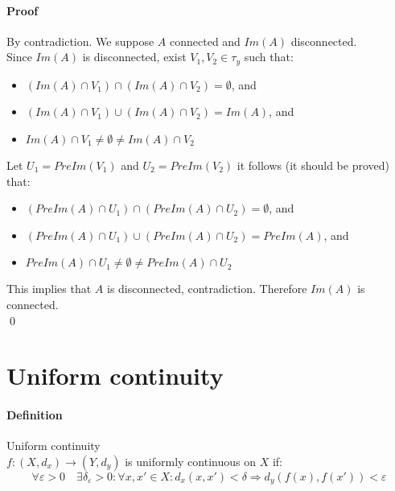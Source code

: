 \documentclass{article}
\newcommand{\func}[3]{#1 : #2 \rightarrow #3}
\newcommand{\Ep}{\varepsilon}
\newcommand{\Def}{\paragraph{Definition}}
\newcommand{\Proof}{\paragraph{Proof}}
\begin{document}
  \Proof By contradiction. We suppose $A$ connected and $Im(A)$ disconnected.
\\Since $Im(A)$ is disconnected, exist $V_1, V_2 \in \tau_y$ such that:
  \begin{itemize}
    \item $(Im(A) \cap V_1) \cap (Im(A) \cap V_2) = \emptyset$, and
    \item $(Im(A) \cap V_1) \cup (Im(A) \cap V_2) = Im(A)$, and
    \item $Im(A) \cap V_1 \neq \emptyset \neq Im(A) \cap V_2$
  \end{itemize}
  Let $U_1 = PreIm(V_1)$ and $U_2 = PreIm(V_2)$ it follows (it should be proved)
  that:
  \begin{itemize}
    \item $(PreIm(A) \cap U_1) \cap (PreIm(A) \cap U_2) = \emptyset$, and
    \item $(PreIm(A) \cap U_1) \cup (PreIm(A) \cap U_2) = PreIm(A)$, and
    \item $PreIm(A) \cap U_1 \neq \emptyset \neq PreIm(A) \cap U_2$
  \end{itemize}
  This implies that $A$ is disconnected, contradiction. Therefore $Im(A)$ is
  connected.
\\\qed

\section{Uniform continuity}

  \Def Uniform continuity
\\$\func{f}{(X,d_x)}{(Y,d_y)}$ is uniformly continuous on $X$ if:
\begin{equation*}
  \forall \Ep > 0 \quad \exists \delta_\Ep > 0 : \forall x,x' \in X : d_x(x,x')
  < \delta \Rightarrow d_y(f(x),f(x')) < \Ep
\end{equation*}
\end{document}
